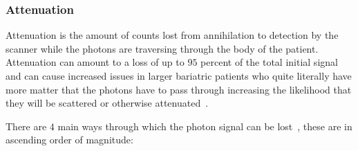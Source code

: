             \subsubsection{Attenuation} \label{attenuation}
                Attenuation is the amount of counts lost from annihilation to detection by the scanner while the photons are traversing through the body of the patient. Attenuation can amount to a loss of up to $95$ percent of the total initial signal and can cause increased issues in larger bariatric patients who quite literally have more matter that the photons have to pass through increasing the likelihood that they will be scattered or otherwise attenuated~.
                
                There are $4$ main ways through which the photon signal can be lost~, these are in ascending order of magnitude:
                
